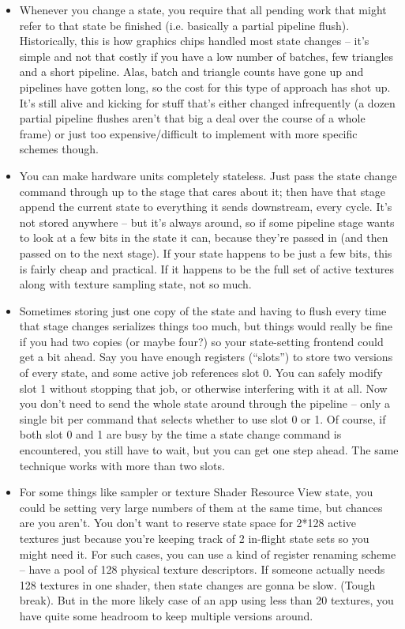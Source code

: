 \documentclass[12pt]{article}
\begin{document}
\begin{itemize}
\item Whenever you change a state, you require that all pending work that might refer to that state be finished (i.e. basically a partial pipeline flush). Historically, this is how graphics chips handled most state changes – it’s simple and not that costly if you have a low number of batches, few triangles and a short pipeline. Alas, batch and triangle counts have gone up and pipelines have gotten long, so the cost for this type of approach has shot up. It’s still alive and kicking for stuff that’s either changed infrequently (a dozen partial pipeline flushes aren’t that big a deal over the course of a whole frame) or just too expensive/difficult to implement with more specific schemes though.

\item You can make hardware units completely stateless. Just pass the state change command through up to the stage that cares about it; then have that stage append the current state to everything it sends downstream, every cycle. It’s not stored anywhere – but it’s always around, so if some pipeline stage wants to look at a few bits in the state it can, because they’re passed in (and then passed on to the next stage). If your state happens to be just a few bits, this is fairly cheap and practical. If it happens to be the full set of active textures along with texture sampling state, not so much.

\item Sometimes storing just one copy of the state and having to flush every time that stage changes serializes things too much, but things would really be fine if you had two copies (or maybe four?) so your state-setting frontend could get a bit ahead. Say you have enough registers (“slots”) to store two versions of every state, and some active job references slot 0. You can safely modify slot 1 without stopping that job, or otherwise interfering with it at all. Now you don’t need to send the whole state around through the pipeline – only a single bit per command that selects whether to use slot 0 or 1. Of course, if both slot 0 and 1 are busy by the time a state change command is encountered, you still have to wait, but you can get one step ahead. The same technique works with more than two slots.

\item For some things like sampler or texture Shader Resource View state, you could be setting very large numbers of them at the same time, but chances are you aren’t. You don’t want to reserve state space for 2*128 active textures just because you’re keeping track of 2 in-flight state sets so you might need it. For such cases, you can use a kind of register renaming scheme – have a pool of 128 physical texture descriptors. If someone actually needs 128 textures in one shader, then state changes are gonna be slow. (Tough break). But in the more likely case of an app using less than 20 textures, you have quite some headroom to keep multiple versions around.


\end{itemize}
\end{document}
